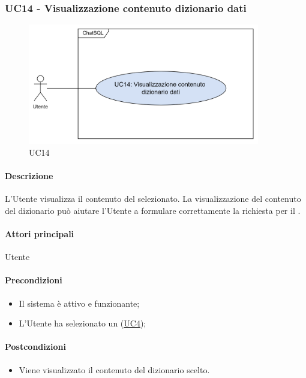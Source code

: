 \subsubsection{UC14 - Visualizzazione contenuto dizionario dati}\label{UC14}

\begin{figure}[H]
  \centering
  \includegraphics[width=0.90\textwidth]{assets/uc14.png}
  \caption{UC14}
\end{figure}

\paragraph*{Descrizione}
L'Utente visualizza il contenuto del  selezionato. La visualizzazione del contenuto del dizionario può aiutare l'Utente a formulare correttamente la richiesta per il .

\paragraph*{Attori principali}
Utente

\paragraph*{Precondizioni}
\begin{itemize}
  \item Il sistema è attivo e funzionante;
  \item L'Utente ha selezionato un  (\hyperref[UC4]{UC4});
\end{itemize}

\paragraph*{Postcondizioni}
\begin{itemize}
  \item Viene visualizzato il contenuto del dizionario scelto.
\end{itemize}


